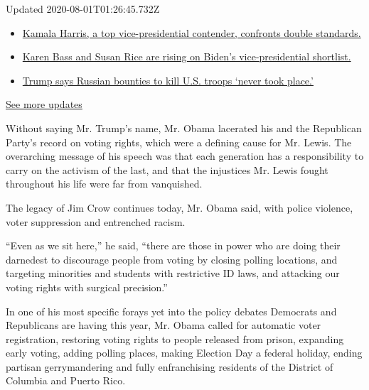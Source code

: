 Updated 2020-08-01T01:26:45.732Z

\begin{itemize}
\tightlist
\item
  \href{https://www.nytimes3xbfgragh.onion/2020/07/31/us/elections/biden-vs-trump.html?action=click\&pgtype=Article\&state=default\&region=MAIN_CONTENT_1\&context=storylines_live_updates\#link-29fdff45}{Kamala
  Harris, a top vice-presidential contender, confronts double
  standards.}
\item
  \href{https://www.nytimes3xbfgragh.onion/2020/07/31/us/elections/biden-vs-trump.html?action=click\&pgtype=Article\&state=default\&region=MAIN_CONTENT_1\&context=storylines_live_updates\#link-13ec3d9c}{Karen
  Bass and Susan Rice are rising on Biden's vice-presidential
  shortlist.}
\item
  \href{https://www.nytimes3xbfgragh.onion/2020/07/31/us/elections/biden-vs-trump.html?action=click\&pgtype=Article\&state=default\&region=MAIN_CONTENT_1\&context=storylines_live_updates\#link-49e9a016}{Trump
  says Russian bounties to kill U.S. troops `never took place.'}
\end{itemize}

\href{https://www.nytimes3xbfgragh.onion/2020/07/31/us/elections/biden-vs-trump.html?action=click\&pgtype=Article\&state=default\&region=MAIN_CONTENT_1\&context=storylines_live_updates}{See
more updates}

Without saying Mr. Trump's name, Mr. Obama lacerated his and the
Republican Party's record on voting rights, which were a defining cause
for Mr. Lewis. The overarching message of his speech was that each
generation has a responsibility to carry on the activism of the last,
and that the injustices Mr. Lewis fought throughout his life were far
from vanquished.

The legacy of Jim Crow continues today, Mr. Obama said, with police
violence, voter suppression and entrenched racism.

``Even as we sit here,'' he said, ``there are those in power who are
doing their darnedest to discourage people from voting by closing
polling locations, and targeting minorities and students with
restrictive ID laws, and attacking our voting rights with surgical
precision.''

In one of his most specific forays yet into the policy debates Democrats
and Republicans are having this year, Mr. Obama called for automatic
voter registration, restoring voting rights to people released from
prison, expanding early voting, adding polling places, making Election
Day a federal holiday, ending partisan gerrymandering and fully
enfranchising residents of the District of Columbia and Puerto Rico.

